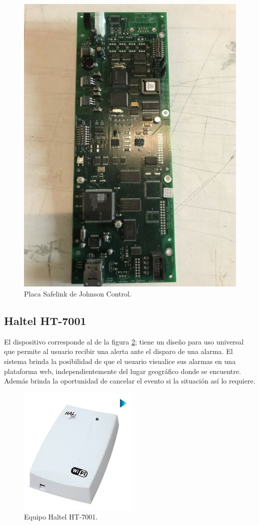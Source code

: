 \begin{figure}[h]
	\centering
	\includegraphics[scale=.4]{./Figures/Capitulo1/FIG_D1.jpg}
	\caption{Placa Safelink de Johnson Control.}
	\label{fig:figura_d1}
\end{figure}

\subsection{Haltel HT-7001}

El dispositivo corresponde al de la figura \ref{fig:figura_e1}; tiene un diseño para uso universal que permite al usuario recibir una alerta ante el disparo de una alarma. El sistema brinda la posibilidad de que el usuario visualice sus alarmas en una plataforma web, independientemente del lugar geográfico donde se encuentre. Además brinda la oportunidad de cancelar el evento si la situación así lo requiere. 

\begin{figure}[h]
	\centering
	\includegraphics[scale=.4]{./Figures/Capitulo1/FIG_E1.jpeg}
	\caption{Equipo Haltel HT-7001.}
	\label{fig:figura_e1}
\end{figure}	
	
